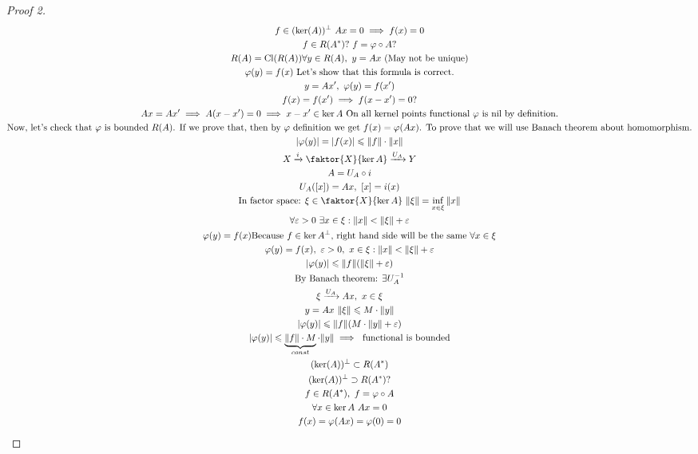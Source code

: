 \begin{proof}[Proof 2]
  \begin{gather*}
    f \in (\ker(A))^\perp\ Ax = 0 \implies f(x) = 0 \\
    f \in R(A^*) ?\ f = \phi \circ A ? \\
    R(A) = \cl{R(A)}
    \forall y \in R(A),\ y = Ax \text{ (May not be unique)} \\
    \phi(y) = f(x) \text{ Let's show that this formula is correct.} \\
    y = A x',\ \phi(y) = f(x') \\
    f(x) = f(x') \implies f(x - x') = 0? \\
    Ax = Ax' \implies A(x - x') = 0 \implies x - x' \in \ker{A}
    \text{ On all kernel points functional $\phi$ is nil by definition.}  \\
    \text{Now, let's check that $\phi$ is bounded $R(A)$. If we prove that, then
    by $\phi$ definition we get $f(x) = \phi(Ax)$. To prove that we will use
    Banach theorem about homomorphism.} \\ 
  |\phi(y)| = |f(x)| \leq \|f\| \cdot \|x\| \\
  X \xrightarrow{i} \faktor{X}{\ker{A}} \xrightarrow{U_A} Y \\
  A = U_A \circ i \\
  U_A([x]) = Ax,\ [x] = i(x) \\
  \text{In factor space: } \xi \in \faktor{X}{\ker{A}}\ \|\xi\| = \inf_{x \in
    \xi} \|x\| \\
  \forall \epsilon > 0\ \exists x \in \xi : \|x\| < \|\xi\| + \epsilon \\ 
  \phi(y) = f(x) \text{Because $f \in \ker{A}^\perp$, right hand side will be
    the same $\forall x \in \xi$} \\
  \phi(y) = f(x),\ \epsilon > 0,\ x \in \xi : \|x\| < \|\xi\| + \epsilon \\
  |\phi(y)| \leq \|f\| (\|\xi\| + \epsilon) \\
  \text{By Banach theorem: } \exists U_A^{-1} \\
  \xi \xrightarrow{U_A} Ax,\ x \in \xi \\
  y = Ax\ \|\xi\| \leq M \cdot \|y\| \\
  |\phi(y)| \leq \|f\| (M \cdot \|y\| + \epsilon) \\
  |\phi(y)| \leq \underbrace{\|f\| \cdot M}_{const} \cdot \|y\| \implies \text{
    functional is bounded} \\
  (\ker(A))^\perp \subset R(A^*) \\
  (\ker(A))^\perp \supset R(A^*) ?\\
  f \in R(A^*),\ f = \phi \circ A \\
  \forall x \in \ker{A}\ Ax = 0 \\
  f(x) = \phi(Ax) = \phi(0) = 0 
\end{gather*}
\end{proof}